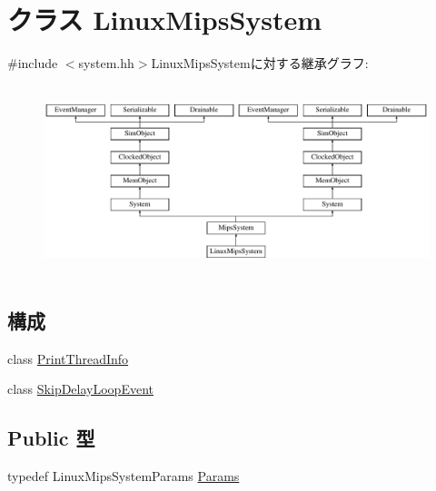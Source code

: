 \hypertarget{classLinuxMipsSystem}{
\section{クラス LinuxMipsSystem}
\label{classLinuxMipsSystem}
}


{\ttfamily \#include $<$system.hh$>$}LinuxMipsSystemに対する継承グラフ:\begin{figure}[H]
\begin{center}
\leavevmode
\includegraphics[height=5.58405cm]{classLinuxMipsSystem}
\end{center}
\end{figure}
\subsection*{構成}
\begin{DoxyCompactItemize}
\item 
class \hyperlink{classLinuxMipsSystem_1_1PrintThreadInfo}{PrintThreadInfo}
\item 
class \hyperlink{classLinuxMipsSystem_1_1SkipDelayLoopEvent}{SkipDelayLoopEvent}
\end{DoxyCompactItemize}
\subsection*{Public 型}
\begin{DoxyCompactItemize}
\item 
typedef LinuxMipsSystemParams \hyperlink{classLinuxMipsSystem_a3d1083cbefc15728ca643470f9efbf13}{Params}
\end{DoxyCompactItemize}

